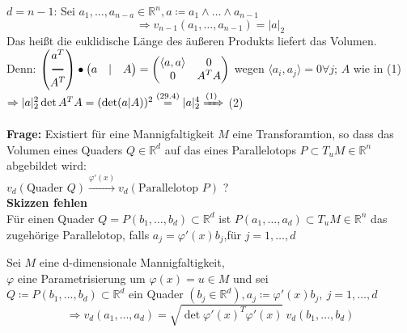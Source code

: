 \begin{beispiel}
    $d = n-1 $: Sei $a_1, \ldots, a_{n-a} \in \mathbb{R}^n, 
    a \coloneqq a_1 \wedge \ldots \wedge a_{n-1} $
    \begin{equation}
        \Rightarrow v_{n-1} (a_1, \ldots, a_{n-1}) = |a|_2
    \end{equation}
    Das heißt die euklidische Länge des äußeren Produkts liefert das Volumen.\\
    Denn: $
    \begin{pmatrix}
        a^T \\
        \rule[.5ex]{1em}{1pt}\\
        A^T
    \end{pmatrix}
    \bullet
    \begin{pmatrix}
        a & | & A 
    \end{pmatrix}
    =
    \begin{pmatrix}
        \langle a,a \rangle & 0 \\
        0 & A^T A
    \end{pmatrix}
    $ wegen $\langle a_i, a_j \rangle = 0 \forall j $; $A$ wie in (1)\\
    $\Rightarrow |a|_2^2 \det A^T A = (\det (a|A))^2 \stackrel{(29.4)}{=}
    |a|_2^4 \xRightarrow{\text{(1)}} $ (2)
\end{beispiel}

\textbf{Frage:} Existiert für eine Mannigfaltigkeit $M$ eine Transforamtion, so dass das
Volumen eines Quaders $Q \in \mathbb{R}^d $ auf das eines Parallelotops 
$P \subset T_uM \in \mathbb{R}^n $ abgebildet wird: \\
$v_d(\text{Quader }Q) \xrightarrow{\varphi'(x)} v_d(\text{Parallelotop } P) $ ?\\
\textbf{Skizzen fehlen}\\
Für einen Quader $Q = P(b_1, \ldots, b_d) \subset \mathbb{R}^d $ ist 
$P(a_1, \ldots, a_d) \subset T_uM \in \mathbb{R}^n $ das zugehörige Parallelotop, falls
$a_j = \varphi'(x) b_j $,für $ j=1, \ldots, d $

\begin{satz}
    Sei $M$ eine d-dimensionale Mannigfaltigkeit,\\
    $\varphi$ eine Parametrisierung um $\varphi(x) = u \in M $
    und sei \\
    $Q \coloneqq P(b_1, \ldots, b_d) \subset \mathbb{R}^d $ ein Quader 
    $(b_j \in \mathbb{R}^d),
    a_j \coloneqq \varphi'(x) b_j,\ j= 1, \ldots, d $
    \begin{equation}
        \Longrightarrow 
        v_d(a_1, \ldots, a_d) = 
        \sqrt{\det \varphi'(x)^T \varphi'(x)}\ v_d(b_1, \ldots, b_d)
    \end{equation}
\end{satz}

